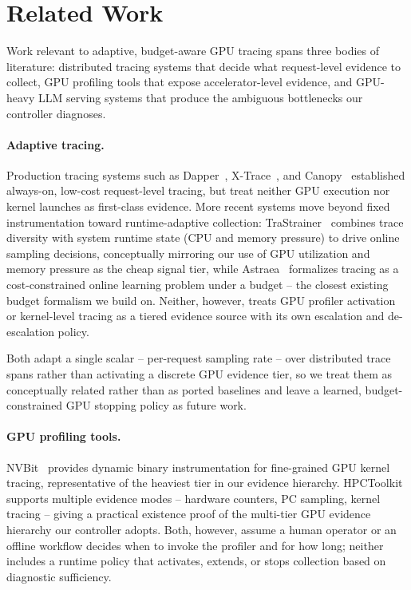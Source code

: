 \section{Related Work}
\label{sec:related-work}

Work relevant to adaptive, budget-aware GPU tracing spans three bodies of literature: distributed tracing systems that decide what request-level evidence to collect, GPU profiling tools that expose accelerator-level evidence, and GPU-heavy LLM serving systems that produce the ambiguous bottlenecks our controller diagnoses.

\paragraph{Adaptive tracing.}
Production tracing systems such as Dapper~\cite{sigelman2010dapper}, X-Trace~\cite{fonseca2007xtrace}, and Canopy~\cite{kaldor2017canopy} established always-on, low-cost request-level tracing, but treat neither GPU execution nor kernel launches as first-class evidence. More recent systems move beyond fixed instrumentation toward runtime-adaptive collection: TraStrainer~\cite{huang2024trastrainer} combines trace diversity with system runtime state (CPU and memory pressure) to drive online sampling decisions, conceptually mirroring our use of GPU utilization and memory pressure as the cheap signal tier, while Astraea~\cite{toslali2024astraea} formalizes tracing as a cost-constrained online learning problem under a budget -- the closest existing budget formalism we build on. Neither, however, treats GPU profiler activation or kernel-level tracing as a tiered evidence source with its own escalation and de-escalation policy.

Both adapt a single scalar -- per-request sampling rate -- over distributed trace spans rather than activating a discrete GPU evidence tier, so we treat them as conceptually related rather than as ported baselines and leave a learned, budget-constrained GPU stopping policy as future work.

\paragraph{GPU profiling tools.}
NVBit~\cite{villa2019nvbit} provides dynamic binary instrumentation for fine-grained GPU kernel tracing, representative of the heaviest tier in our evidence hierarchy. HPCToolkit~\cite{zhou2021hpctoolkit} supports multiple evidence modes -- hardware counters, PC sampling, kernel tracing -- giving a practical existence proof of the multi-tier GPU evidence hierarchy our controller adopts. Both, however, assume a human operator or an offline workflow decides when to invoke the profiler and for how long; neither includes a runtime policy that activates, extends, or stops collection based on diagnostic sufficiency.

